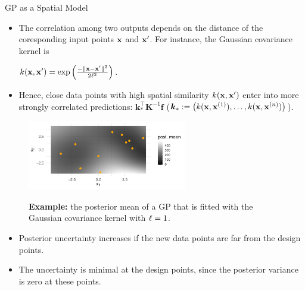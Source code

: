 \begin{frame}[c,allowframebreaks]{GP as a Spatial Model}

\begin{itemize}
\item The correlation among two outputs depends on the distance of the coresponding input points $\mathbf{x}$ and $\mathbf{x}^\prime$. For instance, the Gaussian covariance kernel is \begin{footnotesize}$k(\mathbf{x}, \mathbf{x}^\prime) = \exp \left(\frac{- \|\mathbf{x} - \mathbf{x}^\prime\|^2}{2 \ell^2}\right)$.\end{footnotesize}
\vspace{3mm}
\item Hence, close data points with high spatial similarity $k(\mathbf{x}, \mathbf{x}^\prime)$ enter into more strongly correlated predictions: $\bm{k}_*^\top \bm{K}^{-1} \bm{f}$ ($\bm{k}_* := \left(k(\mathbf{x}, \mathbf{x}^{(1)}),\dots, k(\mathbf{x}, \mathbf{x}^{(n)})\right)$).
\end{itemize}

\begin{figure}\includegraphics[width=0.62\textwidth]{figure/mbo-2d-1.pdf}\par\vspace{-3mm}\begin{footnotesize}\textbf{Example:} the posterior mean of a GP that is fitted with the Gaussian covariance kernel with $\ell = 1$.\end{footnotesize}\end{figure}

\framebreak

\begin{itemize}

\item[\faLightbulbO] Posterior uncertainty increases if the new data points are far from the design points.
\lz
\item[\faLightbulbO] The uncertainty is minimal at the design points, since the posterior variance is zero at these points.
\end{itemize}


\end{frame}
